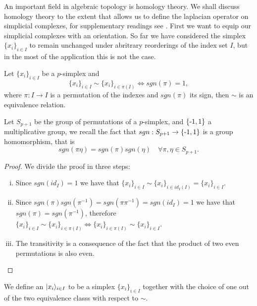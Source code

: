 \documentclass[../1.tex]{subfiles}
\begin{document}
    An important field in algebraic topology is homology theory. We shall discuss homology theory to the extent
    that allows us to define the laplacian operator on simplicial complexes, for supplementary readings see \cite{singerthorpe,hatcher}.
    First we want to equip our simplicial complexes with an orientation. So far we have considered the simplex $\{x_i\}_{i \in I}$ to remain
    unchanged under abritrary reorderings of the index set $I$, but in the most of the application this is not the case.

    \begin{prop}
        Let $\{x_i\}_{i \in I}$ be a $p$-simplex and
        \[ \{x_i\}_{i \in I} \sim \{x_i\}_{i \in \pi(I)} \iff sgn(\pi) = 1,\]
        where $\pi : I \to I$ is a permutation of the indexes and $sgn(\pi)$ its sign, then $\sim$
        is an equivalence relation.
    \end{prop}
    \begin{rem}
        Let $S_{p+1}$ be the group of permutations of a $p$-simplex, and $\{\text{-}1,1\}$ a multiplicative group,
        we recall the fact that $sgn: S_{p+1} \to \{\text{-}1,1\}$ is a group homomorphism, that is \[sgn(\pi\eta) = sgn(\pi)sgn(\eta) \quad \forall \pi,\eta \in S_{p+1}.\]
    \end{rem}
    \begin{proof}
        We divide the proof in three steps:
        \begin{enumerate}[(i)]
            \item Since $sgn(id_I) = 1$ we have that $\{x_i\}_{i \in I} \sim \{x_i\}_{i \in id_I(I)} = \{x_i\}_{i \in I} $.
            \item Since $sgn(\pi)sgn(\pi^{-1}) = sgn(\pi\pi^{-1})=sgn(id_I)=1$ we have that $sgn(\pi) = sgn(\pi^{-1})$, therefore
                  $ \{x_i\}_{i \in I} \sim \{x_i\}_{i \in \pi(I)} \iff \{x_i\}_{i \in \pi(I)} \sim \{x_i\}_{i \in I}$.
            \item The transitivity is a consequence of the fact that the product of two even permutations is also even.\qedhere
        \end{enumerate}
    \end{proof}
  
    \begin{defn}
        We define an  $| x_i \rangle_{i \in I}$ to be a simplex $\{x_i\}_{i \in I}$ together with the choice of
        one out of the two equivalence classs with respect to $\sim$.
    \end{defn}
\end{document}
